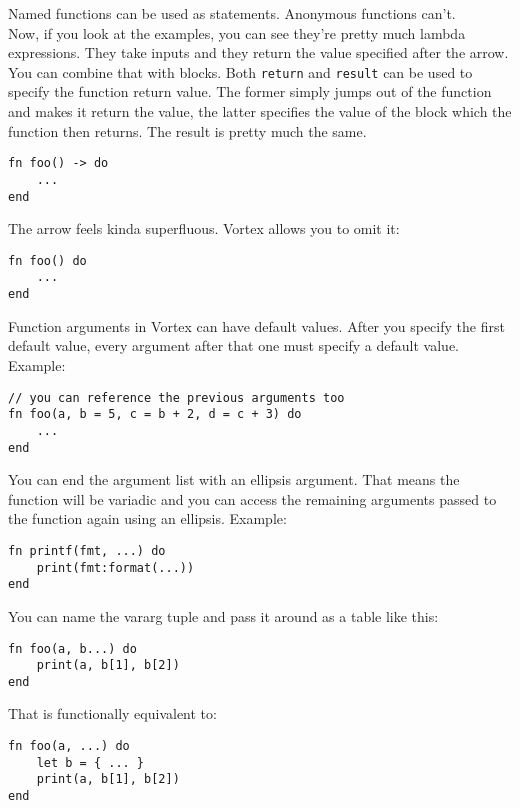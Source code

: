 \documentclass{article}
\begin{document}
Named functions can be used as statements. Anonymous functions can't.\\
Now, if you look at the examples, you can see they're pretty much lambda
expressions. They take inputs and they return the value specified after
the arrow. You can combine that with blocks. Both \verb|return| and
\verb|result| can be used to specify the function return value. The
former simply jumps out of the function and makes it return the value,
the latter specifies the value of the block which the function then
returns. The result is pretty much the same.
\begin{lstlisting}[language=vortex]
fn foo() -> do
    ...
end
\end{lstlisting}
The arrow feels kinda superfluous. Vortex allows you to omit it:
\begin{lstlisting}[language=vortex]
fn foo() do
    ...
end
\end{lstlisting}
Function arguments in Vortex can have default values. After you specify
the first default value, every argument after that one must specify a default
value. Example:
\begin{lstlisting}[language=vortex]
// you can reference the previous arguments too
fn foo(a, b = 5, c = b + 2, d = c + 3) do
    ...
end
\end{lstlisting}
You can end the argument list with an ellipsis argument. That means the
function will be variadic and you can access the remaining arguments
passed to the function again using an ellipsis. Example:
\begin{lstlisting}[language=vortex]
fn printf(fmt, ...) do
    print(fmt:format(...))
end
\end{lstlisting}
You can name the vararg tuple and pass it around as a table like this:
\begin{lstlisting}[language=vortex]
fn foo(a, b...) do
    print(a, b[1], b[2])
end
\end{lstlisting}
That is functionally equivalent to:
\begin{lstlisting}[language=vortex]
fn foo(a, ...) do
    let b = { ... }
    print(a, b[1], b[2])
end
\end{lstlisting}
\end{document}
